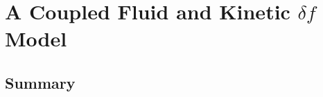 \chapter{A Coupled Fluid and Kinetic $\delta\! f$ Model}\label{cha:delta f correction}
    

    
    


    \section*{Summary}
    